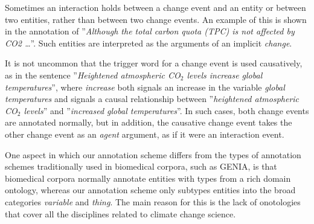 Sometimes an interaction holds between a change event and an entity or between two entities, rather than between two change events. An example of this is shown in the annotation of ''\emph{Although the total carbon quota (TPC) is not affected by CO2 \dots}''. Such entities are interpreted as the arguments of an implicit \emph{change}. 

It is not uncommon that the trigger word for a change event is used causatively, as in the sentence ''\emph{Heightened atmospheric CO$_2$ levels increase global temperatures}'', where \emph{increase} both signals an increase in the variable \emph{global temperatures} and signals a causal relationship between ''\emph{heightened atmospheric CO$_2$ levels}'' and ''\emph{increased global temperatures}''. In such cases, both change events are annotated normally, but in addition, the causative change event takes the other change event as an \emph{agent} argument, as if it were an interaction event.

One aspect in which our annotation scheme differs from the types of annotation schemes  traditionally used in biomedical corpora, such as GENIA\citep{kim08}, is that biomedical corpora normally annotate entities with types from a rich domain ontology, whereas our annotation scheme only subtypes entities into the broad categories \emph{variable} and \emph{thing}. The main reason for this is the lack of onotologies that cover all the disciplines related to climate change science.
